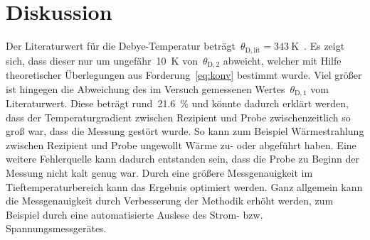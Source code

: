 \section{Diskussion}
\label{sec:diskussion}
%
Der Literaturwert für die Debye-Temperatur
beträgt~$\theta_{\mathrm{D,lit}}=\SI{343}{\kelvin}$~\cite{kittel}.
Es zeigt sich, dass dieser nur um ungefähr~\SI{10}{\kelvin}
von~$\theta_{\mathrm{D,2}}$ abweicht, welcher mit Hilfe theoretischer
Überlegungen aus Forderung~\eqref{eq:konv} bestimmt wurde.
Viel größer ist hingegen die Abweichung des im Versuch gemessenen
Wertes~$\theta_{\mathrm{D,1}}$ vom Literaturwert. Diese beträgt
rund~\SI{21.6}{\percent} und könnte dadurch erklärt werden, dass der
Temperaturgradient zwischen Rezipient und Probe zwischenzeitlich so groß war,
dass die Messung gestört wurde. So kann zum Beispiel Wärmestrahlung zwischen
Rezipient und Probe ungewollt Wärme zu- oder abgeführt haben. Eine weitere
Fehlerquelle kann dadurch entstanden sein, dass die Probe zu Beginn der Messung
nicht kalt genug war. Durch eine größere Messgenauigkeit im
Tieftemperaturbereich kann das Ergebnis optimiert werden. Ganz allgemein kann
die Messgenauigkeit durch Verbesserung der Methodik erhöht werden, zum Beispiel
durch eine automatisierte Auslese des Strom- bzw. Spannungsmessgerätes.
